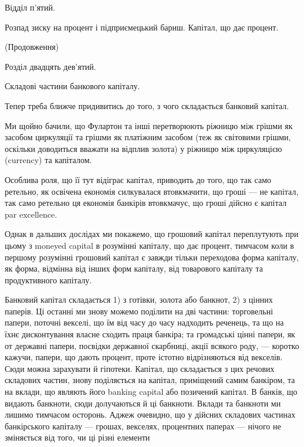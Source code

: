 Відділ п’ятий.

Розпад зиску на процент і підприємецький
бариш. Капітал, що дає
процент.

(Продовження)

Розділ двадцять дев’ятий.

Складові частини банкового капіталу.

Тепер треба ближче придивитись до того, з чого складається банковий
капітал.

Ми щойно бачили, що Фулартон та інші перетворюють ріжницю між грішми
як засобом циркуляції та грішми як платіжним засобом (теж як світовими
грішми, оскільки доводиться вважати на відплив золота) у ріжницю між циркуляцією
(currency) та капіталом.

Особлива роля, що її тут відіграє капітал, приводить до того, що так само
ретельно, як освічена економія силкувалася втовкмачити, що гроші — не капітал,
так само ретельно ця економія банкірів втовкмачує, що гроші дійсно є капітал
par excellence.

Однак в дальших дослідах ми покажемо, що грошовий капітал переплутують
при цьому з moneyed capital в розумінні капіталу, що дає процент,
тимчасом коли в першому розумінні грошовий капітал є завжди тільки переходова
форма капіталу, як форма, відмінна від інших форм капіталу, від
товарового капіталу та продуктивного капіталу.

Банковий капітал складається 1) з готівки, золота або банкнот, 2) з
цінних паперів. Ці останні ми знову можемо поділити на дві частини: торговельні
папери, поточні векселі, що їм від часу до часу надходить реченець, та
що на їхнє дисконтування власне сходить праця банкіра; та громадські
цінні папери, як от державні папери, посвідки державної скарбниці, акції
всякого роду, — коротко кажучи, папери, що дають процент, проте істотно відрізняються
від векселів. Сюди можна зарахувати й гіпотеки. Капітал, що складається
з цих речових складових частин, знову поділяється на капітал, приміщений
самим банкіром, та на вклади, що являють його banking capital або
позичений капітал. В банків, що видають банкноти, сюди долучаються й ці
банкноти. Вклади та банкноти ми лишимо тимчасом осторонь. Аджеж очевидно,
що у дійсних складових частинах банкірського капіталу — грошах, векселях,
процентних паперах — нічого не зміняється від того, чи ці різні елементи
\parbreak{}  %
